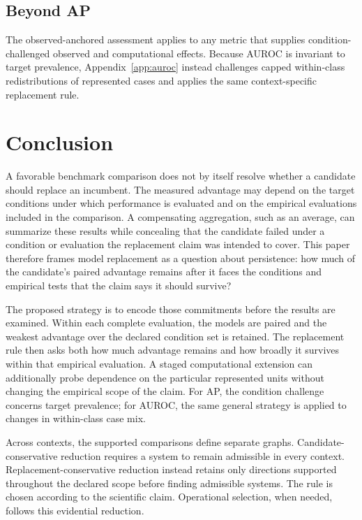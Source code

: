 \documentclass[11pt]{article}
\theoremstyle{remark}
\begin{document}
\subsection{Beyond AP}

The observed-anchored assessment applies to any metric that supplies condition-challenged observed and computational effects. Because AUROC is invariant to target prevalence, Appendix~\ref{app:auroc} instead challenges capped within-class redistributions of represented cases and applies the same context-specific replacement rule.

\section{Conclusion}

A favorable benchmark comparison does not by itself resolve whether a
candidate should replace an incumbent. The measured advantage may depend on
the target conditions under which performance is evaluated and on the
empirical evaluations included in the comparison. A compensating aggregation,
such as an average, can summarize these results while concealing that the
candidate failed under a condition or evaluation the replacement claim was
intended to cover. This paper therefore frames model replacement as a question
about persistence: how much of the candidate's paired advantage remains after
it faces the conditions and empirical tests that the claim says it should
survive?

The proposed strategy is to encode those commitments before the results are
examined. Within each complete evaluation, the models are paired and the
weakest advantage over the declared condition set is retained. The replacement
rule then asks both how much advantage remains and how broadly it survives
within that empirical evaluation. A staged computational extension can
additionally probe dependence on the particular represented units without
changing the empirical scope of the claim. For AP, the condition challenge
concerns target prevalence; for AUROC, the same general strategy is applied to
changes in within-class case mix.

Across contexts, the supported comparisons define separate graphs.
Candidate-conservative reduction requires a system to remain admissible in
every context. Replacement-conservative reduction instead retains only
directions supported throughout the declared scope before finding admissible
systems. The rule is chosen according to the scientific claim. Operational
selection, when needed, follows this evidential reduction.
\end{document}

